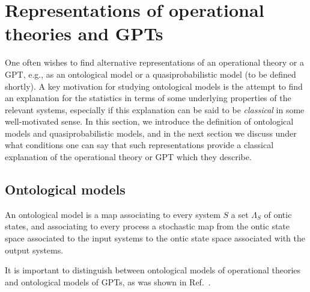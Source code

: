 \documentclass[onecolum,aps,groupedaddress,nofootinbib]{revtex4-2}
\begin{document}
\section{Representations of operational theories and GPTs}

One often wishes to find alternative representations of an operational theory or a GPT, e.g., as an ontological model or a quasiprobabilistic model (to be defined shortly). A key motivation for studying ontological models is the attempt to find an explanation for the statistics in terms of some underlying properties of the relevant systems, especially if this explanation can be said to be {\em classical} in some well-motivated sense. In this section, we introduce the definition of ontological models and quasiprobabilistic models, and in the next section we discuss under what conditions one can say that such representations provide a classical explanation of the operational theory or GPT which they describe.


\subsection{Ontological models}\label{subsec:ont}

An ontological model is a map associating to every system $S$ a set $\Lambda_S$ of ontic states, and associating to every process a stochastic map from the ontic state space associated to the input systems to the ontic state space associated with the output systems.

It is important to distinguish between ontological models of operational theories and ontological models of GPTs, as was shown in Ref.~\cite{schmid2019characterization}.
\end{document}
